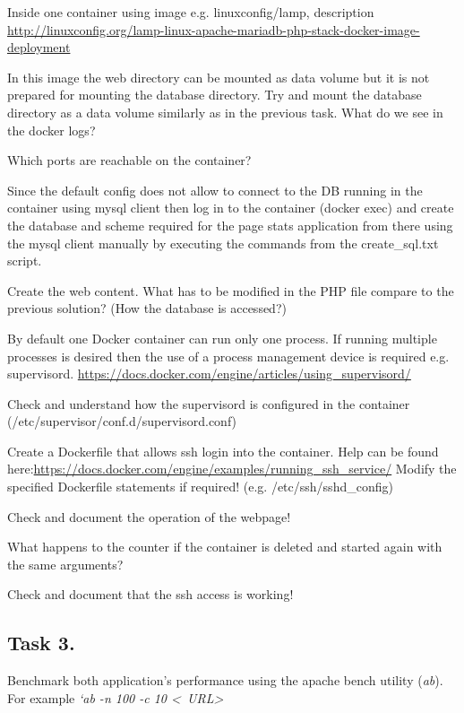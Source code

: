 \documentclass[a4paper]{article}
\begin{document}
Inside one container using image e.g. linuxconfig/lamp, description
\url{http://linuxconfig.org/lamp-linux-apache-mariadb-php-stack-docker-image-deployment}

In this image the web directory can be mounted as data volume but it is not prepared for mounting the database
directory. Try and mount the database directory as a data volume similarly as in the previous task. What do we see in
the docker logs?

Which ports are reachable on the container?

Since the default config does not allow to connect to the DB running in the container using mysql client then log in to
the container (docker exec) and create the database and scheme required for the page stats application from there using
the mysql client manually by executing the commands from the create\_sql.txt script.

Create the web content. What has to be modified in the PHP file compare to the previous solution? (How the database is
accessed?)

By default one Docker container can run only one process. If running multiple processes is desired then the use of a
process management device is required e.g. supervisord.
\url{https://docs.docker.com/engine/articles/using_supervisord/}

Check and understand how the supervisord is configured in the container (/etc/supervisor/conf.d/supervisord.conf)

Create a Dockerfile that allows ssh login into the container. Help can be found
here:\url{https://docs.docker.com/engine/examples/running_ssh_service/} Modify the specified Dockerfile statements if
required! (e.g. /etc/ssh/sshd\_config)

Check and document the operation of the webpage!

What happens to the counter if the container is deleted and started again with the same arguments?

Check and document that the ssh access is working!

\subsection{Task 3.}

Benchmark both application's performance using the apache bench utility (\emph{ab}). For example \emph{`ab -n 100 -c 10
    \textless~URL\textgreater}
\end{document}
